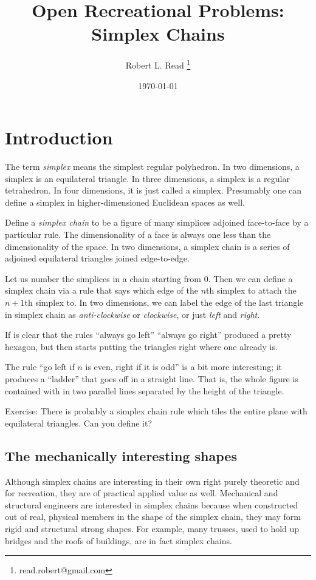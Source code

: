 \documentclass[11pt]{article}
\title{Open Recreational Problems: Simplex Chains}
\author{Robert L. Read
  \thanks{read.robert@gmail.com}
}
\affil{Founder, Public Invention, an educational non-profit.}
\date{\today}
\begin{document}
\maketitle


\section{Introduction}

The term {\em simplex} means the simplest regular polyhedron. In two dimensions, a simplex is an equilateral triangle.
In three dimensions, a simplex is a regular tetrahedron. In four dimensions, it is just called a simplex.
Presumably one can define a simplex in higher-dimensioned Euclidean spaces as well.

Define a {\em simplex chain} to be a figure of many simplices adjoined face-to-face by a particular rule.
The dimensionality of a face is always one less than the dimensionality of the space. In two dimensions,
a simplex chain is a series of adjoined equilateral triangles joined edge-to-edge.

Let us number the simplices in a chain starting from $0$. Then we can define a simplex chain via a rule
that says which edge of the $n$th simplex to attach the $n+1$th simplex to. In two dimensions, we can
label the edge of the last triangle in simplex chain as {\em anti-clockwise} or {\em clockwise}, or just
{\em left} and {\em right}.

If is clear that the rules ``always go left'' ``always go right'' produced a pretty hexagon, but then starts putting the triangles
right where one already is.

The rule ``go left if $n$ is even, right if it is odd'' is a bit more interesting; it produces a ``ladder'' that goes off
in a straight line. That is, the whole figure is contained with in two parallel lines separated by the height of the triangle.

Exercise: There is probably a simplex chain rule which tiles the entire plane with equilateral triangles. Can you define it?

\subsection{The mechanically interesting shapes}

Although simplex chains are interesting in their own right purely theoretic and for recreation,
they are of practical applied value as well.
Mechanical and structural engineers are interested in simplex chains because when constructed out of real, physical
members in the shape of the simplex chain, they may form rigid and structural strong shapes.
For example, many trusses, used to hold up bridges and the roofs of buildings, are in fact simplex chains.
\end{document}
